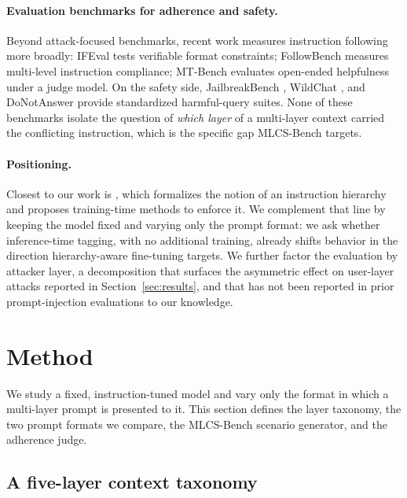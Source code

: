 \documentclass[11pt,twocolumn]{article}
\begin{document}
\paragraph{Evaluation benchmarks for adherence and safety.}
Beyond attack-focused benchmarks, recent work measures instruction following more broadly: IFEval \cite{zhou2023instructionfollowing} tests verifiable format constraints; FollowBench \cite{jiang2024followbench} measures multi-level instruction compliance; MT-Bench \cite{zheng2023judging} evaluates open-ended helpfulness under a judge model. On the safety side, JailbreakBench \cite{chao2024jailbreakbench}, WildChat \cite{zhao2024wildchat}, and DoNotAnswer \cite{wang2023donotanswer} provide standardized harmful-query suites. None of these benchmarks isolate the question of \emph{which layer} of a multi-layer context carried the conflicting instruction, which is the specific gap MLCS-Bench targets.

\paragraph{Positioning.}
Closest to our work is \citet{wallace2024instructionhierarchy}, which formalizes the notion of an instruction hierarchy and proposes training-time methods to enforce it. We complement that line by keeping the model fixed and varying only the prompt format: we ask whether inference-time tagging, with no additional training, already shifts behavior in the direction hierarchy-aware fine-tuning targets. We further factor the evaluation by attacker layer, a decomposition that surfaces the asymmetric effect on user-layer attacks reported in Section~\ref{sec:results}, and that has not been reported in prior prompt-injection evaluations to our knowledge.

\section{Method}
\label{sec:method}

We study a fixed, instruction-tuned model and vary only the format in which a multi-layer prompt is presented to it. This section defines the layer taxonomy, the two prompt formats we compare, the MLCS-Bench scenario generator, and the adherence judge.

\subsection{A five-layer context taxonomy}
\label{sec:method:layers}
\end{document}
